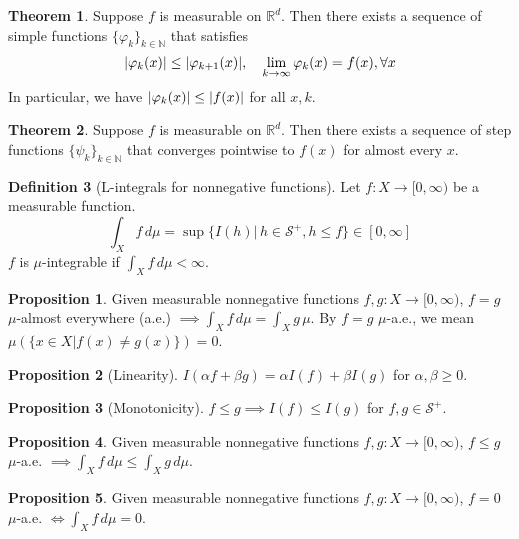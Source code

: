 \documentclass{article}
\theoremstyle{definition}
\newtheorem{prop}{Proposition}[section]
\newcommand{\R}{\mathbb{R}}
\newcommand{\al}{\alpha}
\newcommand{\be}{\beta}
\theoremstyle{theorem}
\newtheorem{theorem}{Theorem}[section]
\newtheorem{definition}[theorem]{Definition}
\begin{document}
\begin{theorem}
Suppose $f$ is measurable on $\R^d$. Then there exists a sequence of simple functions $\{ \varphi_k \}_{k\in\mathbb{N}}$ that satisfies 
\begin{equation*}
    \abs{\varphi_k(x)} \leq \abs{\varphi_{k+1}(x)}, \quad \lim_{k\to \infty}\varphi_k(x) = f(x), \forall x
\end{equation*}
In particular, we have $\abs{\varphi_k(x)} \leq \abs{f(x)}$ for all $x,k$. 
\end{theorem}


\begin{theorem}
Suppose $f$ is measurable on $\R^d$. Then there exists a sequence of step functions $\{ \psi_k \}_{k\in \mathbb{N}}$ that converges pointwise to $f(x)$ for almost every $x$. 
\end{theorem}



\begin{definition}[L-integrals for nonnegative functions]
Let $f: X \to [0,\infty)$ be a measurable function. 
\begin{equation*}
    \int_X f\,d\mu =  \sup\{ I(h) \vert \, h \in \mathcal{S}^+, h\leq f\} \in [0,\infty]
\end{equation*}
$f$ is $\mu$-integrable if $\int_X f\,d\mu < \infty$.
\end{definition}



\begin{prop}
Given measurable nonnegative functions $f,g: X \to [0,\infty)$, $f=g$ $\mu$-almost everywhere (a.e.) $\implies \int_X f\,d\mu = \int_X g\,\mu $. By $f=g$ $\mu$-a.e., we mean $\mu(\{ x\in X \vert f(x) \neq g(x) \}) = 0$.
\end{prop}


\begin{prop}[Linearity]
$I(\al f + \be g) = \al I(f) + \be I(g)$ for $\al,\be \geq 0$.
\end{prop}

\begin{prop}[Monotonicity]
$f\leq g \implies I(f) \leq I(g)$ for $f,g\in \mathcal{S}^+$.
\end{prop}

\begin{prop}
Given measurable nonnegative functions $f,g: X \to [0,\infty)$, $f\leq g$ $\mu$-a.e. $\implies \int_X f\,d\mu \leq \int_X g\,d\mu$.
\end{prop}

\begin{prop}
Given measurable nonnegative functions $f,g: X \to [0,\infty)$, $f=0$ $\mu$-a.e. $\iff \int_X f\,d\mu = 0$.
\end{prop}
\end{document}
